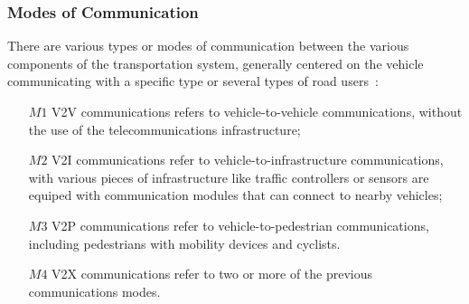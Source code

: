 
\subsubsection{Modes of Communication}
 
There are various types or modes of communication between the various components of the transportation system, generally centered on the vehicle communicating with a specific type or several types of road users~\cite{araniti_lte_2013,molina-masegosa_lte-v_2017,shladover_connected_2018,dar_wireless_2010,abboud_interworking_2016,chen_lte-v_2016}: 


\begin{enumerate}
\item[$M1$] \acrfull{V2V} communications refers to vehicle-to-vehicle communications, without  the use of the telecommunications infrastructure;
\item[$M2$] \acrfull{V2I} communications refer to vehicle-to-infrastructure communications, with various pieces of infrastructure like traffic controllers or sensors are equiped with communication modules that can connect to nearby vehicles;
\item[$M3$] \acrfull{V2P} communications refer to vehicle-to-pedestrian communications, including pedestrians with mobility devices and cyclists. 
\item[$M4$] \acrfull{V2X} communications refer to two or more of the previous communications modes.
\end{enumerate}


